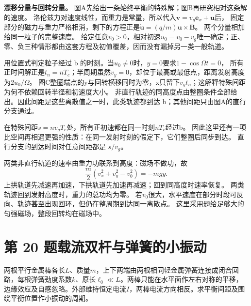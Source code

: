 \documentclass[UTF8,fontset=fandol,a4paper,11pt]{ctexart}
\newcommand{\figcaption}[1]{\par\vspace{2pt}{\small\color{muted}#1}\par}
\begin{document}
\textbf{漂移分量与回转分量。} 图A先给出一条始终平衡的特殊解；图B再研究相对这条解的速度。
洛伦兹力对速度线性，而重力是常量，所以代入$\boldsymbol v=v_g\boldsymbol e_x+\boldsymbol u$后，
固定部分的磁力与重力严格相消，剩下的方程正是$\dot{\boldsymbol u}=(q/m)\boldsymbol u\times\boldsymbol B$。
两个分量相加给同一粒子的完整速度。
给定任意$v_0>0$，相对初速$u_0=v_0-v_g$唯一确定；正、零、负三种情形都由这套方程及初值覆盖，因而没有漏掉另一类一般轨道。

用位置式判定粒子经过 b 的时刻。当$u_0\ne0$时，$y=0$要求$1-\cos\Omega t=0$，
所有正时间解正是$t_n=nT_c$；半周期虽然$v_y=0$，却位于最高或最低点，距离发射高度为$2u_0/\Omega$。
图C整圈端点的y与回转横移同时为零，x只留下$v_gt_n$；这解释特殊间距为何不依赖回转半径和初速度大小。
非直行轨迹的同高度点由整圈条件全部给出。因此间距是这些离散值之一时，此类轨迹都到达 b；其他间距只由图A的直行分支通过。

在特殊间距$s=n v_gT_c$处，所有正初速都在同一时刻$nT_c$经过b。
因此这里还有一项比空间再相遇更强的性质：在同一发射时刻的假定下，它们整圈后同步到达。
直行分支的到达时间对任意间距都是 $s/v_g$。

两类非直行轨道的速率由重力功联系到高度：磁场不做功，故
\[
\frac m2(v_x^2+v_y^2-v_0^2)=-mgy.
\]
上拱轨道先减速再加速，下拱轨道先加速再减速；回到同高度时速率恢复。
两类轨迹回到发射高度时，重力的总功均为零。
若$v_0$很大，水平速度在部分时段可反向、轨迹甚至出现回环，但仍在整周期到达同一离散点。
这里采用题给足够大的匀强磁场，整段回转均在磁场中。




\section*{第 20 题\quad 载流双杆与弹簧的小振动}\label{q:20}

两根平行金属棒各长$L$、质量$m$，上下两端由两根相同轻金属弹簧连接成闭合回路，每根弹簧劲度系数$k$、原长$\ell_0\ll L$。两棒只能在水平面作左右对称的平移，边缘效应及自感忽略。外部维持恒定电流$I$，两棒电流方向相反。求平衡间距及围绕平衡位置作小振动的周期。

\begin{center}\begin{minipage}{.98\linewidth}\centering
{}\figcaption{图电2.20　两杆电流反向，弹簧并联提供横向回复力。}\end{minipage}\end{center}
\end{document}
